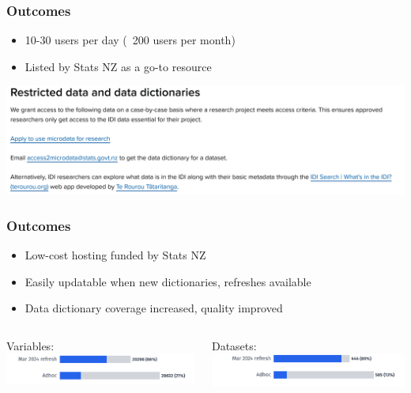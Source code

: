 \documentclass[aspectratio=169]{beamer}
\begin{document}
\begin{frame}
    \frametitle{Outcomes}

    \begin{itemize}
        \item 10-30 users per day (~200 users per month)
        \item Listed by Stats NZ as a go-to resource
    \end{itemize}

    \vspace{2em}
    \includegraphics[width=\linewidth]{conc1.png}

\end{frame}

\begin{frame}
    \frametitle{Outcomes}

    \begin{itemize}
        \item Low-cost hosting funded by Stats NZ
        \item Easily updatable when new dictionaries, refreshes available
        \item Data dictionary coverage increased, quality improved
    \end{itemize}

    \begin{columns}
        \begin{column}{0.5\textwidth}
            \begin{center}
                Variables:\\[1em]
    \includegraphics[width=\linewidth]{dd-cov1.png}
            \end{center}
        \end{column}
        \begin{column}{0.5\textwidth}
            \begin{center}
                Datasets:\\[1em]
                \includegraphics[width=\linewidth]{dd-cov2.png}
            \end{center}
        \end{column}
    \end{columns}





\end{frame}
\end{document}
